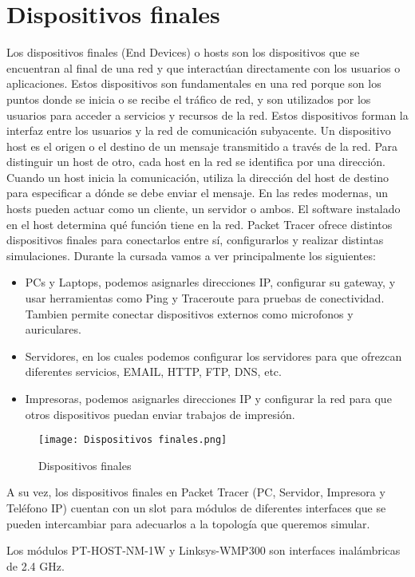 \documentclass{article}
\begin{document}
\section{Dispositivos finales}
Los dispositivos finales (End Devices) o hosts son los dispositivos que se encuentran al final de una red y que interactúan directamente con los usuarios o aplicaciones. Estos dispositivos son fundamentales en una red porque son los puntos donde se inicia o se recibe el tráfico de red, y son utilizados por los usuarios para acceder a servicios y recursos de la red. Estos dispositivos forman la interfaz entre los usuarios y la red de comunicación subyacente. Un dispositivo host es el origen o el destino de un mensaje transmitido a través de la red. Para distinguir un host de otro, cada host en la red se identifica por una dirección. Cuando un host inicia la comunicación, utiliza la dirección del host de destino para especificar a dónde se debe enviar el mensaje. En las redes modernas, un hosts pueden actuar como un cliente, un servidor o ambos. El software instalado en el host determina qué función tiene en la red. Packet Tracer ofrece distintos dispositivos finales para conectarlos entre sí, configurarlos y realizar distintas simulaciones. Durante la cursada vamos a ver principalmente los siguientes:
\begin{itemize}
    \item PCs y Laptops, podemos asignarles direcciones IP, configurar su gateway, y usar herramientas como Ping y Traceroute para pruebas de conectividad. Tambien permite conectar dispositivos externos como microfonos y auriculares.
    \item Servidores, en los cuales podemos configurar los servidores para que ofrezcan diferentes servicios, EMAIL, HTTP, FTP, DNS, etc.
    \item Impresoras, podemos asignarles direcciones IP y configurar la red para que otros dispositivos puedan enviar trabajos de impresión.
\end{itemize}
\begin{figure}[h]
  \centering
  \texttt{[image: Dispositivos finales.png]}
  \caption{Dispositivos finales}
\end{figure}
A su vez, los dispositivos finales en Packet Tracer (PC, Servidor, Impresora y Teléfono IP) cuentan con un slot para módulos de diferentes interfaces que se pueden intercambiar para adecuarlos a la topología que queremos simular.

Los módulos PT-HOST-NM-1W y Linksys-WMP300 son interfaces inalámbricas de 2.4 GHz.
\end{document}
